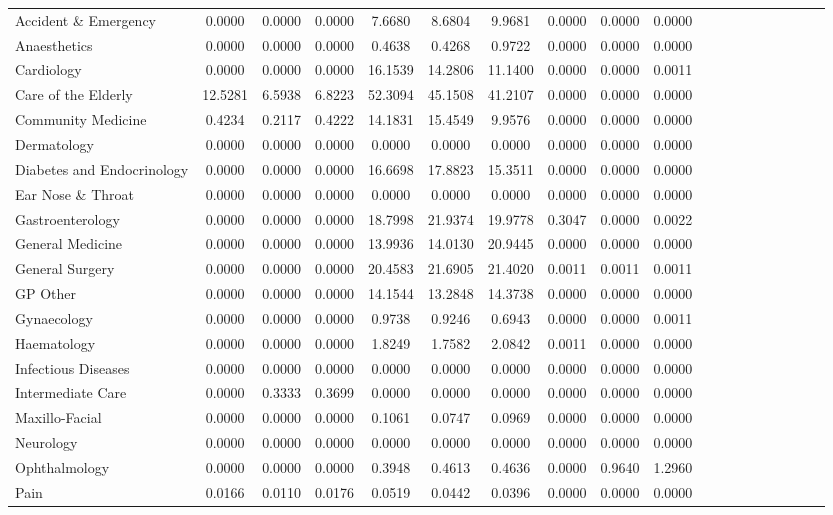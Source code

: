 \documentclass[thesis.tex]{subfiles}
\begin{document}
\begin{landscape}
\begin{table}[h!]
{\begin{tabular}{lcccccccccccccccccc}
Accident \& Emergency&	0.0000&	0.0000&	0.0000&	7.6680&	8.6804&	9.9681&	0.0000&	0.0000&	0.0000\\
Anaesthetics&	0.0000&	0.0000&	0.0000&	0.4638&	0.4268&	0.9722&	0.0000&	0.0000&	0.0000\\
Cardiology&	0.0000&	0.0000&	0.0000&	16.1539&	14.2806&	11.1400&	0.0000&	0.0000&	0.0011\\
Care of the Elderly&	12.5281&	6.5938&	6.8223&	52.3094&	45.1508&	41.2107&	0.0000&	0.0000&	0.0000\\
Community Medicine	&0.4234&	0.2117&	0.4222&	14.1831&	15.4549&	9.9576&	0.0000&	0.0000&	0.0000\\
Dermatology&	0.0000&	0.0000&	0.0000&	0.0000&	0.0000&	0.0000&	0.0000&	0.0000&	0.0000\\
Diabetes and Endocrinology&	0.0000&	0.0000&	0.0000&	16.6698&	17.8823&	15.3511&	0.0000&	0.0000&	0.0000\\
Ear Nose \& Throat&	0.0000&	0.0000&	0.0000&	0.0000&	0.0000&	0.0000&	0.0000&	0.0000&	0.0000\\
Gastroenterology&	0.0000&	0.0000&	0.0000&	18.7998&	21.9374&	19.9778&	0.3047&	0.0000&	0.0022\\
General Medicine	&0.0000&	0.0000&	0.0000&	13.9936&	14.0130&	20.9445&	0.0000&	0.0000&	0.0000\\
General Surgery	&0.0000&	0.0000&	0.0000&	20.4583&	21.6905&	21.4020&	0.0011&	0.0011&	0.0011\\
GP Other	&0.0000&	0.0000&	0.0000&	14.1544&	13.2848&	14.3738&	0.0000&	0.0000&	0.0000\\
Gynaecology&	0.0000&	0.0000&	0.0000&	0.9738&	0.9246&	0.6943&	0.0000&	0.0000&	0.0011\\
Haematology&	0.0000&	0.0000&	0.0000&	1.8249&	1.7582&	2.0842&	0.0011&	0.0000&	0.0000\\
Infectious Diseases	&0.0000&	0.0000&	0.0000&	0.0000&	0.0000&	0.0000&	0.0000&	0.0000&	0.0000\\
Intermediate Care	&0.0000&	0.3333&	0.3699&	0.0000&	0.0000&	0.0000&	0.0000&	0.0000&	0.0000\\
Maxillo-Facial&	0.0000	&0.0000	&0.0000&	0.1061	&0.0747&	0.0969&	0.0000	&0.0000&	0.0000\\
Neurology&	0.0000&	0.0000&	0.0000&	0.0000&	0.0000&	0.0000&	0.0000&	0.0000&	0.0000\\
Ophthalmology&	0.0000&	0.0000&	0.0000&	0.3948&	0.4613&	0.4636&	0.0000&	0.9640&	1.2960\\
Pain&	0.0166&	0.0110&	0.0176&	0.0519&	0.0442&	0.0396&	0.0000&	0.0000&	0.0000\\

\end{tabular}}
\end{table}
\end{landscape}
\end{document}

